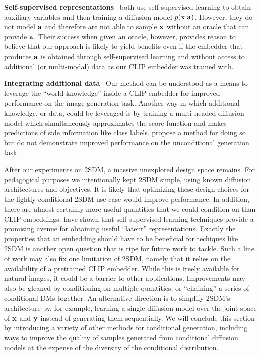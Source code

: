 \textbf{Self-supervised representations}~
\citet{bao2022conditional,hu2022self} both use self-supervised learning to obtain auxiliary variables and then training a diffusion model $p({\mathbf{x}}|{\mathbf{a}})$. However, they do not model ${\mathbf{a}}$ and therefore are not able to sample ${\mathbf{x}}$ without an oracle that can provide ${\mathbf{a}}$. Their success when given an oracle, however, provides reason to believe that our approach is likely to yield benefits even if the embedder that produces ${\mathbf{a}}$ is obtained through self-supervised learning and without access to additional (or multi-modal) data as our CLIP embedder was trained with.

\textbf{Integrating additional data}~
Our method can be understood as a means to leverage the ``world knowledge'' inside a CLIP embedder for improved performance on the image generation task. Another way in which additional knowledge, or data, could be leveraged is by training a multi-headed diffusion model which simultaneously approximates the score function and makes predictions of side information like class labels. \citet{deja2023learning} propose a method for doing so but do not demonstrate improved performance on the unconditional generation task.

After our experiments on 2SDM, a massive unexplored design space remains. For pedagogical purposes we intentionally kept 2SDM simple, using known diffusion architectures and objectives. It is likely that optimizing these design choices for the lightly-conditional 2SDM use-case would improve performance. In addition, there are almost certainly more useful quantities that we could condition on than CLIP embeddings. 
\citet{bao2022conditional,hu2022self} have shown that self-supervised learning techniques provide a promising avenue for obtaining useful ``latent'' representations. Exactly the properties that an embedding should have to be beneficial for techiques like 2SDM is another open question that is ripe for future work to tackle. Such a line of work may also fix one limitation of 2SDM, namely that it relies on the availability of a pretrained CLIP embedder. While this is freely available for natural images, it could be a barrier to other applications. Improvements may also be gleaned by conditioning on multiple quantities, or ``chaining'' a series of conditional DMs together. An alternative direction is to simplify 2SDM's architecture by, for example, learning a single diffusion model over the joint space of ${\mathbf{x}}$ and ${\mathbf{y}}$ instead of generating them sequentially. We will conclude this section by introducing a variety of other methods for conditional generation, including ways to improve the quality of samples generated from conditional diffusion models at the expense of the diversity of the conditional distribution.


